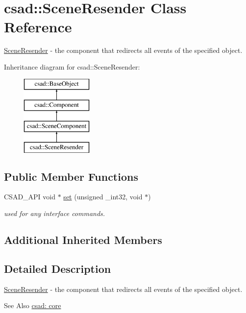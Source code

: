 \hypertarget{classcsad_1_1_scene_resender}{\section{csad\-:\-:Scene\-Resender Class Reference}
\label{classcsad_1_1_scene_resender}
}


\hyperlink{classcsad_1_1_scene_resender}{Scene\-Resender} -\/ the component that redirects all events of the specified object.  


Inheritance diagram for csad\-:\-:Scene\-Resender\-:\begin{figure}[H]
\begin{center}
\leavevmode
\includegraphics[height=4.000000cm]{classcsad_1_1_scene_resender}
\end{center}
\end{figure}
\subsection*{Public Member Functions}
\begin{DoxyCompactItemize}
\item 
\hypertarget{classcsad_1_1_scene_resender_a70247fb3c572288274e122315f92a7ec}{C\-S\-A\-D\-\_\-\-A\-P\-I void $\ast$ \hyperlink{classcsad_1_1_scene_resender_a70247fb3c572288274e122315f92a7ec}{set} (unsigned \-\_\-int32, void $\ast$)}\label{classcsad_1_1_scene_resender_a70247fb3c572288274e122315f92a7ec}

\begin{DoxyCompactList}\small\item\em used for any interface commands. \end{DoxyCompactList}\end{DoxyCompactItemize}
\subsection*{Additional Inherited Members}


\subsection{Detailed Description}
\hyperlink{classcsad_1_1_scene_resender}{Scene\-Resender} -\/ the component that redirects all events of the specified object. 

\begin{DoxySeeAlso}{See Also}
\hyperlink{group__core}{csad\-: core} 
\end{DoxySeeAlso}
